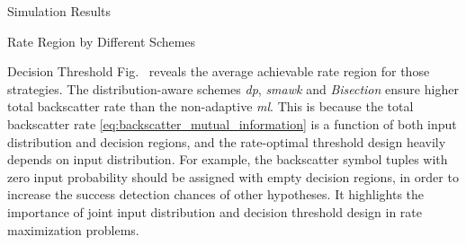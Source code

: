 \documentclass[journal]{IEEEtran}
\begin{document}
\begin{section}{Simulation Results}
\begin{subsection}{Rate Region by Different Schemes}
\begin{subsubsection}{Decision Threshold}
			Fig.~ reveals the average achievable rate region for those strategies.
			The distribution-aware schemes \emph{\gls{dp}}, \emph{\gls{smawk}} and \emph{Bisection} ensure higher total backscatter rate than the non-adaptive \emph{\gls{ml}}.
			This is because the total backscatter rate \eqref{eq:backscatter_mutual_information} is a function of both input distribution and decision regions, and the rate-optimal threshold design heavily depends on input distribution.
			For example, the backscatter symbol tuples with zero input probability should be assigned with empty decision regions, in order to increase the success detection chances of other hypotheses.
			It highlights the importance of joint input distribution and decision threshold design in rate maximization problems.
		\end{subsubsection}

	\end{subsection}



\end{section}
\end{document}
